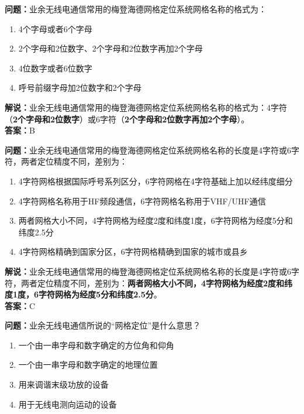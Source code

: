 \documentclass{ctexbook}
\begin{document}
\noindent\textbf{问题：}业余无线电通信常用的梅登海德网格定位系统网格名称的格式为：

\begin{enumerate}[label=\Alph*), leftmargin=3em]
	\item 4个字母或者6个字母
	\item 2个字母和2位数字、2个字母和2位数字再加2个字母
	\item 4位数字或者6位数字
	\item 呼号前缀字母加2位数字和2个字母
\end{enumerate}

\noindent\textbf{解说：}业余无线电通信常用的梅登海德网格定位系统网格名称的格式为：4字符（\textbf{2个字母和2位数字}）或6字符（\textbf{2个字母和2位数字再加2个字母}）。\\\noindent\textbf{答案：}B


\bigskip


\noindent\textbf{问题：}业余无线电通信常用的梅登海德网格定位系统网格名称的长度是4字符或6字符，两者定位精度不同，差别为：

\begin{enumerate}[label=\Alph*), leftmargin=3em]
	\item 4字符网格根据国际呼号系列区分，6字符网格在4字符基础上加以经纬度细分
	\item 4字符网格名称用于HF频段通信，6字符网格名称用于VHF/UHF通信
	\item 两者网格大小不同，4字符网格为经度2度和纬度1度，6字符网格为经度5分和纬度2.5分
	\item 4字符网格精确到国家分区，6字符网格精确到国家的城市或县乡
\end{enumerate}

\noindent\textbf{解说：}业余无线电通信常用的梅登海德网格定位系统网格名称的长度是4字符或6字符，两者定位精度不同，差别为：\textbf{两者网格大小不同，4字符网格为经度2度和纬度1度，6字符网格为经度5分和纬度2.5分}。\\\noindent\textbf{答案：}C

\bigskip


\noindent\textbf{问题：}业余无线电通信所说的“网格定位”是什么意思？

\begin{enumerate}[label=\Alph*), leftmargin=3em]
	\item 一个由一串字母和数字确定的方位角和仰角
	\item 一个由一串字母和数字确定的地理位置
	\item 用来调谐末级功放的设备
	\item 用于无线电测向运动的设备
\end{enumerate}
\end{document}

